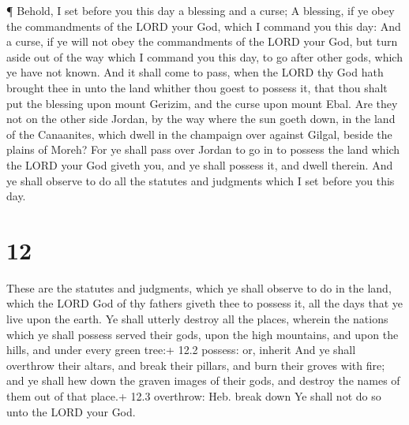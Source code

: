  ¶ Behold, I set before you this day a blessing and a
curse;  A blessing, if ye obey the commandments of the LORD
your God, which I command you this day:  And a curse, if ye
will not obey the commandments of the LORD your God, but turn aside out
of the way which I command you this day, to go after other gods, which
ye have not known.  And it shall come to pass, when the
LORD thy God hath brought thee in unto the land whither thou goest to
possess it, that thou shalt put the blessing upon mount Gerizim, and the
curse upon mount Ebal.  Are they not on the other side
Jordan, by the way where the sun goeth down, in the land of the
Canaanites, which dwell in the champaign over against Gilgal, beside the
plains of Moreh?  For ye shall pass over Jordan to go in to
possess the land which the LORD your God giveth you, and ye shall
possess it, and dwell therein.  And ye shall observe to do
all the statutes and judgments which I set before you this day.

\hypertarget{section-11}{%
\section{12}\label{section-11}}

 These are the statutes and judgments, which ye shall
observe to do in the land, which the LORD God of thy fathers giveth thee
to possess it, all the days that ye live upon the earth.  Ye
shall utterly destroy all the places, wherein the nations which ye shall
possess served their gods, upon the high mountains, and upon the hills,
and under every green tree:+ 12.2 possess: or, inherit  And
ye shall overthrow their altars, and break their pillars, and burn their
groves with fire; and ye shall hew down the graven images of their gods,
and destroy the names of them out of that place.+ 12.3 overthrow: Heb.
break down  Ye shall not do so unto the LORD your God.

